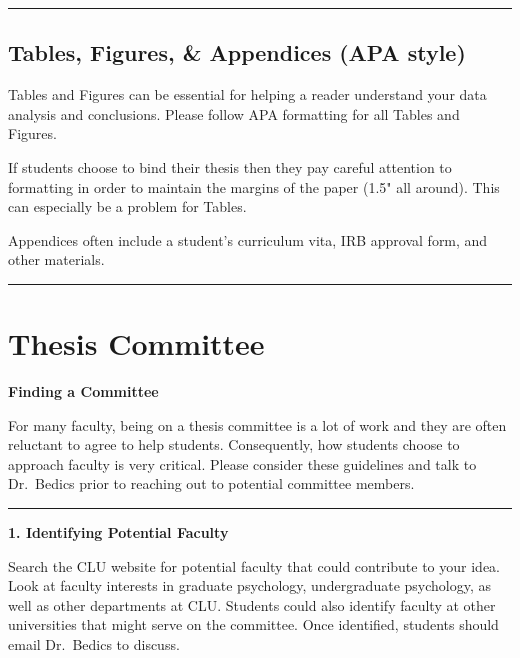 \documentclass[openany]{book}
\begin{document}
\begin{center}\rule{0.5\linewidth}{0.5pt}\end{center}

\hypertarget{tables-figures-appendices-apa-style}{%
\section{Tables, Figures, \& Appendices (APA style)}\label{tables-figures-appendices-apa-style}}

Tables and Figures can be essential for helping a reader understand your data analysis and conclusions. Please follow APA formatting for all Tables and Figures.

If students choose to bind their thesis then they pay careful attention to formatting in order to maintain the margins of the paper (1.5" all around). This can especially be a problem for Tables.

Appendices often include a student's curriculum vita, IRB approval form, and other materials.

\begin{center}\rule{0.5\linewidth}{0.5pt}\end{center}

\hypertarget{people}{%
\chapter{Thesis Committee}\label{people}}

\textbf{Finding a Committee}

For many faculty, being on a thesis committee is a lot of work and they are often reluctant to agree to help students. Consequently, how students choose to approach faculty is very critical. Please consider these guidelines and talk to Dr.~Bedics prior to reaching out to potential committee members.

\begin{center}\rule{0.5\linewidth}{0.5pt}\end{center}

\textbf{1. Identifying Potential Faculty}

Search the CLU website for potential faculty that could contribute to your idea. Look at faculty interests in graduate psychology, undergraduate psychology, as well as other departments at CLU. Students could also identify faculty at other universities that might serve on the committee. Once identified, students should email Dr.~Bedics to discuss.
\end{document}
